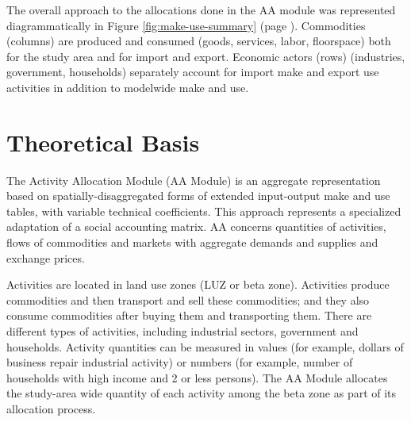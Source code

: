 The overall approach to the allocations done in the AA module was represented diagrammatically in Figure \ref{fig:make-use-summary} (page \pageref{fig:make-use-summary}). Commodities (columns) are produced and consumed (goods, services, labor, floorspace) both for the study area and for import and export. Economic actors (rows) (industries, government, households) separately account for import make and export use activities in addition to modelwide make and use.

\section{Theoretical Basis}\label{sec:aa-theoreticals}
The Activity Allocation Module (AA Module) is an aggregate representation based on spatially-disaggregated forms of extended input-output make and use tables, with variable technical coefficients.  This approach represents a specialized adaptation of a social accounting matrix. AA concerns quantities of activities, flows of commodities and markets with aggregate demands and supplies and exchange prices.

Activities are located in land use zones (LUZ or beta zone). Activities produce commodities and then transport and sell these commodities; and they also consume commodities after buying them and transporting them.  There are different types of activities, including industrial sectors, government and households. Activity quantities can be measured in values (for example, dollars of business repair industrial activity) or numbers (for example, number of households with high income and 2 or less persons). The AA Module allocates the study-area wide quantity of each activity among the beta zone as part of its allocation process.

